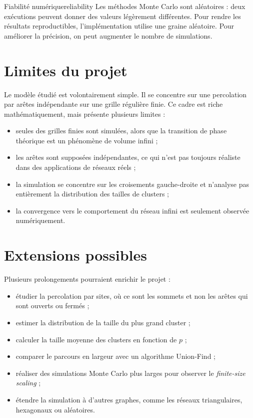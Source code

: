 \documentclass[11pt,a4paper]{report}
\begin{document}
\begin{remarkbox}{Fiabilité numérique}{reliability}
Les méthodes Monte Carlo sont aléatoires : deux exécutions peuvent donner des valeurs légèrement différentes. Pour rendre les résultats reproductibles, l'implémentation utilise une graine aléatoire. Pour améliorer la précision, on peut augmenter le nombre de simulations.
\end{remarkbox}

\section{Limites du projet}

Le modèle étudié est volontairement simple. Il se concentre sur une percolation par arêtes indépendante sur une grille régulière finie. Ce cadre est riche mathématiquement, mais présente plusieurs limites :
\begin{itemize}
    \item seules des grilles finies sont simulées, alors que la transition de phase théorique est un phénomène de volume infini ;
    \item les arêtes sont supposées indépendantes, ce qui n'est pas toujours réaliste dans des applications de réseaux réels ;
    \item la simulation se concentre sur les croisements gauche-droite et n'analyse pas entièrement la distribution des tailles de clusters ;
    \item la convergence vers le comportement du réseau infini est seulement observée numériquement.
\end{itemize}

\section{Extensions possibles}

Plusieurs prolongements pourraient enrichir le projet :
\begin{itemize}
    \item étudier la percolation par sites, où ce sont les sommets et non les arêtes qui sont ouverts ou fermés ;
    \item estimer la distribution de la taille du plus grand cluster ;
    \item calculer la taille moyenne des clusters en fonction de $p$ ;
    \item comparer le parcours en largeur avec un algorithme Union-Find ;
    \item réaliser des simulations Monte Carlo plus larges pour observer le \textit{finite-size scaling} ;
    \item étendre la simulation à d'autres graphes, comme les réseaux triangulaires, hexagonaux ou aléatoires.
\end{itemize}
\end{document}
